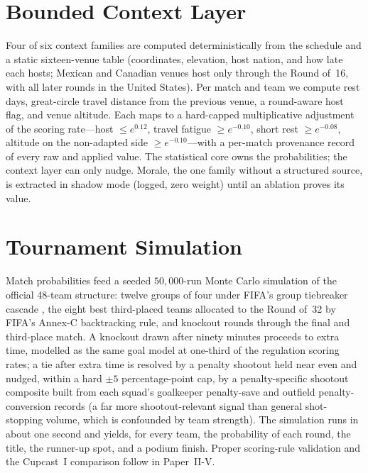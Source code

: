 \documentclass[11pt]{article}
\begin{document}
\section{Bounded Context Layer}\label{sec:ctx}
Four of six context families are computed deterministically from the schedule
and a static sixteen-venue table (coordinates, elevation, host nation, and how
late each hosts; Mexican and Canadian venues host only through the Round of~16,
with all later rounds in the United States). Per match and team we compute rest
days, great-circle travel distance from the previous venue, a round-aware host
flag, and venue altitude. Each maps to a hard-capped multiplicative adjustment
of the scoring rate---host $\le e^{0.12}$, travel fatigue $\ge e^{-0.10}$, short
rest $\ge e^{-0.08}$, altitude on the non-adapted side $\ge e^{-0.10}$---with a
per-match provenance record of every raw and applied value. The statistical core
owns the probabilities; the context layer can only nudge. Morale, the one family
without a structured source, is extracted in shadow mode (logged, zero weight)
until an ablation proves its value.

\section{Tournament Simulation}\label{sec:sim}
Match probabilities feed a seeded $50{,}000$-run Monte Carlo simulation of the
official 48-team structure: twelve groups of four under FIFA's group tiebreaker
cascade \cite{fifaregs}, the eight best third-placed teams allocated to the
Round of~32 by FIFA's Annex-C backtracking rule, and knockout rounds through the
final and third-place match. A knockout drawn after ninety minutes proceeds to
extra time, modelled as the same goal model at one-third of the regulation
scoring rates; a tie after extra time is resolved by a penalty shootout held
near even and nudged, within a hard $\pm5$ percentage-point cap, by a
penalty-specific shootout composite built from each squad's goalkeeper
penalty-save and outfield penalty-conversion records (a far more shootout-relevant
signal than general shot-stopping volume, which is confounded by team strength). The simulation runs in about one second
and yields, for every team, the probability of each round, the title, the
runner-up spot, and a podium finish. Proper scoring-rule validation
\cite{gneitingraftery2007} and the Cupcast~I comparison follow in
Paper~II-V.



\end{document}
